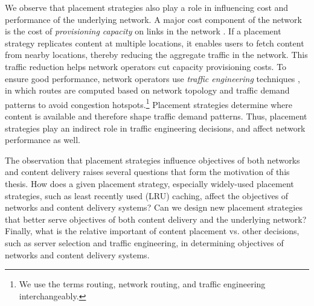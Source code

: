 We observe that placement strategies also play a role in influencing cost and performance of the underlying network. 
A major cost component of the network is the cost of \emph{provisioning capacity} on links in the network \cite{capacityplan}. 
If a placement strategy replicates content at multiple locations, it enables users to fetch content from nearby locations, thereby reducing the aggregate traffic in the network. This traffic reduction helps network operators cut capacity provisioning costs. 
To ensure good performance, network operators use \emph{traffic engineering} techniques \cite{fortz2000internet}, in which routes are  computed based on network topology and traffic demand patterns to avoid congestion hotspots.\footnote{We use the terms routing, network routing, and traffic engineering interchangeably.}   Placement strategies determine where content is available and therefore shape traffic demand patterns. Thus, placement strategies play an indirect role in  traffic engineering decisions, and affect network performance as well.



The observation that placement strategies influence objectives of both networks and content delivery raises several questions that form the motivation of this thesis. How does a given placement strategy, especially widely-used placement strategies, such as least recently used (LRU) caching, affect the objectives of networks and content delivery systems? Can we design new placement strategies that better serve objectives of both content delivery and  the underlying network? Finally, what is the relative important of content placement vs. other decisions, such as server selection and traffic engineering, in determining objectives of networks and content delivery systems.



